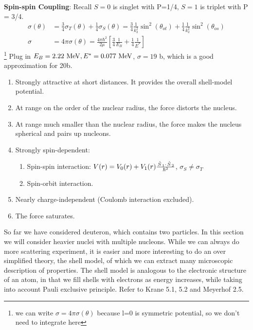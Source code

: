 \documentclass{school-22.101-notes}
\begin{document}
\textbf{Spin-spin Coupling}: Recall $S=0$ is singlet with P=1/4, $S=1$ is triplet with P = 3/4. 
\begin{align}
\sigma( \theta) &= \frac{3}{4} \sigma_T (\theta) + \frac{1}{4} \sigma_S (\theta) = \frac{3}{4} \frac{1}{k_2^2} \sin^2 (\theta_{ot} ) + \frac{1}{4} \frac{1}{k_2^2} \sin^2 (\theta_{os} ) \\
\sigma &= 4 \pi \sigma (\theta) = \frac{4 \pi \hbar^2}{2 \mu} \left[ \frac{3}{4} \frac{1}{E_B} + \frac{1}{4} \frac{1}{E^*} \right] 
\end{align}\footnote{we can write $\sigma = 4 \pi \sigma(\theta)$ because l=0 is symmetric potential, so we don't need to integrate here} 
Plug in $E_B = 2.22 \mbox{ } \mathrm{MeV}, E^* = 0.077 \mbox{ } \mathrm{MeV}$, $\sigma = 19$ b, which is a good approximation for 20b. 

\begin{enumerate}
\item Strongly attractive at short distances. It provides the overall shell-model potential.
\item At range on the order of the nuclear radius, the force distorts the nucleus. 
\item At range much smaller than the nuclear radius, the force makes the nucleus spherical and pairs up nucleons.
\item Strongly spin-dependent:
    \begin{enumerate}
    \item Spin-spin interaction: $V(r) = V_0(r) + V_1 (r) \frac{\left. \hat{S} \right._1 \cdot \left. \hat{S} \right._2}{\hbar^2} $, $\sigma_S \neq \sigma_T$
    \item Spin-orbit interaction.
    \end{enumerate}    
\item Nearly charge-independent (Coulomb interaction excluded).
\item The force saturates.
\end{enumerate}



So far we have considered deuteron, which contains two particles. In this section we will consider heavier nuclei with multiple nucleons. While we can always do more scattering experiment, it is easier and more interesting to do an over simplified theory, the shell model, of which we can extract many microscopic description of properties. The shell model is analogous to the electronic structure of an atom, in that we fill shells with electrons as energy increases, while taking into account Pauli exclusive principle. Refer to Krane 5.1, 5.2 and Meyerhof 2.5. 
\end{document}
